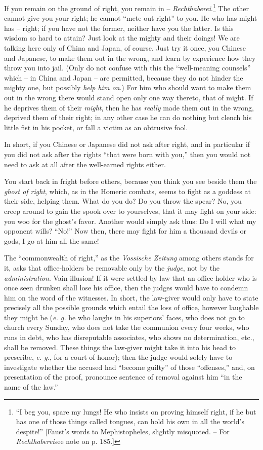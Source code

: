\documentclass[12pt,a4paper]{book}
\begin{document}
If you remain on the ground of right, you remain in -- 
\textit{Rechthaberei}.\footnote{``I beg you, spare my lungs! He who insists 
on proving himself right, if he but has one of those things called tongues, 
can hold his own in all the world's despite!'' [Faust's words to 
Mephistopheles, slightly misquoted. -- For \textit{Rechthaberei}see note on p. 
185.]} The other cannot give you your right; he cannot ``mete out right'' to 
you. He who has might has -- right; if you have not the former, neither have 
you the latter. Is this wisdom so hard to attain? Just look at the mighty and 
their doings! We are talking here only of China and Japan, of course. Just try 
it once, you Chinese and Japanese, to make them out in the wrong, and learn by 
experience how they throw you into jail. (Only do not confuse with this the 
``well-meaning counsels'' which -- in China and Japan -- are permitted, 
because they do not hinder the mighty one, but possibly \textit{help him on}.) 
For him who should want to make them out in the wrong there would stand open 
only one way thereto, that of might. If he deprives them of their 
\textit{might}, then he has \textit{really} made them out in the wrong, 
deprived them of their right; in any other case he can do nothing but clench 
his little fist in his pocket, or fall a victim as an obtrusive fool.

In short, if you Chinese or Japanese did not ask after right, and in 
particular if you did not ask after the rights ``that were born with you,'' 
then you would not need to ask at all after the well-earned rights either.

You start back in fright before others, because you think you see beside them 
the \textit{ghost of right}, which, as in the Homeric combats, seems to fight 
as a goddess at their side, helping them. What do you do? Do you throw the 
spear? No, you creep around to gain the spook over to yourselves, that it may 
fight on your side: you woo for the ghost's favor. Another would simply ask 
thus: Do I will what my opponent wills? ``No!'' Now then, there may fight 
for him a thousand devils or gods, I go at him all the same!

The ``commonwealth of right,'' as the \textit{Vossische Zeitung} among 
others stands for it, asks that office-holders be removable only by the 
\textit{judge}, not by the \textit{administration}. Vain illusion! If it were 
settled by law that an office-holder who is once seen drunken shall lose his 
office, then the judges would have to condemn him on the word of the 
witnesses. In short, the law-giver would only have to state precisely all the 
possible grounds which entail the loss of office, however laughable they might 
be (\textit{e. g.} he who laughs in his superiors' faces, who does not go to 
church every Sunday, who does not take the communion every four weeks, who 
runs in debt, who has disreputable associates, who shows no determination, 
etc., shall be removed. These things the law-giver might take it into his head 
to prescribe, \textit{e. g.}, for a court of honor); then the judge would 
solely have to investigate whether the accused had ``become guilty'' of 
those ``offenses,'' and, on presentation of the proof, pronounce sentence of 
removal against him ``in the name of the law.''
\end{document}
